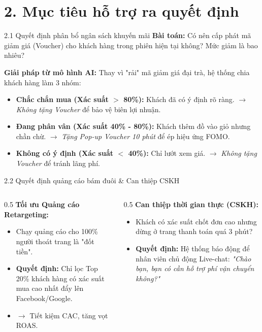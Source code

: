 \documentclass[aspectratio=169, 11pt]{beamer}
\begin{document}
\section{2. Mục tiêu hỗ trợ ra quyết định}

\begin{frame}{2.1 Quyết định phân bổ ngân sách khuyến mãi}
    \textbf{Bài toán:} Có nên cấp phát mã giảm giá (Voucher) cho khách hàng trong phiên hiện tại không? Mức giảm là bao nhiêu?
    
    \vspace{0.3cm}
    \textbf{Giải pháp từ mô hình AI:} Thay vì "rải" mã giảm giá đại trà, hệ thống chia khách hàng làm 3 nhóm:
    \begin{itemize}
        \item \textbf{Chắc chắn mua (Xác suất $>$ 80\%):} Khách đã có ý định rõ ràng. $\rightarrow$ \textit{Không tặng Voucher} để bảo vệ biên lợi nhuận.
        \item \textbf{Đang phân vân (Xác suất 40\% - 80\%):} Khách thêm đồ vào giỏ nhưng chần chừ. $\rightarrow$ \textit{Tặng Pop-up Voucher 10 phút} để ép hiệu ứng FOMO.
        \item \textbf{Không có ý định (Xác suất $<$ 40\%):} Chỉ lướt xem giá. $\rightarrow$ \textit{Không tặng Voucher} để tránh lãng phí.
    \end{itemize}
\end{frame}

\begin{frame}{2.2 Quyết định quảng cáo bám đuôi \& Can thiệp CSKH}
    \begin{columns}
        \begin{column}{0.5\textwidth}
            \textbf{Tối ưu Quảng cáo Retargeting:}
            \begin{itemize}
                \item Chạy quảng cáo cho 100\% người thoát trang là "đốt tiền".
                \item \textbf{Quyết định:} Chỉ lọc Top 20\% khách hàng có xác suất mua cao nhất đẩy lên Facebook/Google. 
                \item $\rightarrow$ Tiết kiệm CAC, tăng vọt ROAS.
            \end{itemize}
        \end{column}
        
        \begin{column}{0.5\textwidth}
            \textbf{Can thiệp thời gian thực (CSKH):}
            \begin{itemize}
                \item Khách có xác suất chốt đơn cao nhưng dừng ở trang thanh toán quá 3 phút?
                \item \textbf{Quyết định:} Hệ thống báo động để nhân viên chủ động Live-chat: \textit{"Chào bạn, bạn có cần hỗ trợ phí vận chuyển không?"}
            \end{itemize}
        \end{column}
    \end{columns}
\end{frame}
\end{document}
